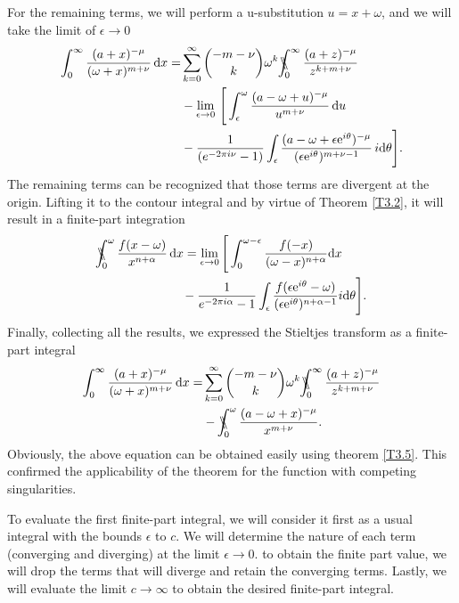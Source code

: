 For the remaining terms, we will perform a u-substitution $u = x+\omega$, and we will take the limit of $\epsilon \to 0$
\begin{align}
\begin{split}
    \int_{0}^{\infty} \frac{ (a+x)^{-\mu}}{(\omega+x)^{m+\nu}} \, \mathrm{d}x  =  & \sum_{k=0}^{\infty} \binom{-m-\nu}{k} \omega^{k} \bbint{0}{\infty} \frac{(a+z)^{-\mu}}{z^{k+m+\nu}} \\& - \lim_{\epsilon \to 0} \, \Bigg[ \int_{\epsilon}^{\omega} \frac{ (a-\omega+u)^{-\mu}}{u^{m+\nu}} \, \mathrm{d}u \\&  - \frac{1}{\left( e^{-2\pi i \nu}-1 \right)} \int_{\epsilon} \frac{(a-\omega+\epsilon \mathrm{e}^{i\theta})^{-\mu}}{(\epsilon \mathrm{e}^{i\theta})^{m+\nu-1}}\, i \mathrm{d}\theta \Bigg].
\end{split}
\end{align}
The remaining terms can be recognized that those terms are divergent at the origin. Lifting it to the contour integral and by virtue of Theorem \ref{T3.2}, it will result in a finite-part integration
\begin{align}
\begin{split}
\bbint{0}{\omega}\frac{f(x-\omega)}{x^{n+\alpha}}\,&\mathrm{d}x=\lim_{\epsilon\rightarrow0}\Bigg[\int_{0}^{\omega-\epsilon}\frac{f(-x)}{(\omega-x)^{n+\alpha}}\mathrm{d}x \\& \quad-\frac{1}{e^{-2\pi i\alpha}-1} \int_{\epsilon}\frac{f(\epsilon \mathrm{e}^{i\theta} - \omega)}{(\epsilon \mathrm{e}^{i\theta})^{n+\alpha-1}}i\mathrm{d}\theta \Bigg].
\end{split}
\end{align}
Finally, collecting all the results, we expressed the Stieltjes transform as a finite-part integral
\begin{align}
\begin{split}
    \int_{0}^{\infty} \frac{ (a+x)^{-\mu}}{(\omega+x)^{m+\nu}} \, \mathrm{d}x  =  & \sum_{k=0}^{\infty} \binom{-m-\nu}{k} \omega^{k} \bbint{0}{\infty} \frac{(a+z)^{-\mu}}{z^{k+m+\nu}} \\& - \bbint{0}{\omega} \frac{(a-\omega+x)^{-\mu}}{x^{m+\nu}}.
    \label{c2I1}
\end{split}
\end{align}
Obviously, the above equation can be obtained easily using theorem \ref{T3.5}. This confirmed the applicability of the theorem for the function with competing singularities.

To evaluate the first finite-part integral, we will consider it first as a usual integral with the bounds $\epsilon$ to $c$. We will determine the nature of each term (converging and diverging) at the limit $\epsilon \to 0$. to obtain the finite part value, we will drop the terms that will diverge and retain the converging terms. Lastly, we will evaluate the limit $c \to \infty$  to obtain the desired finite-part integral. 

